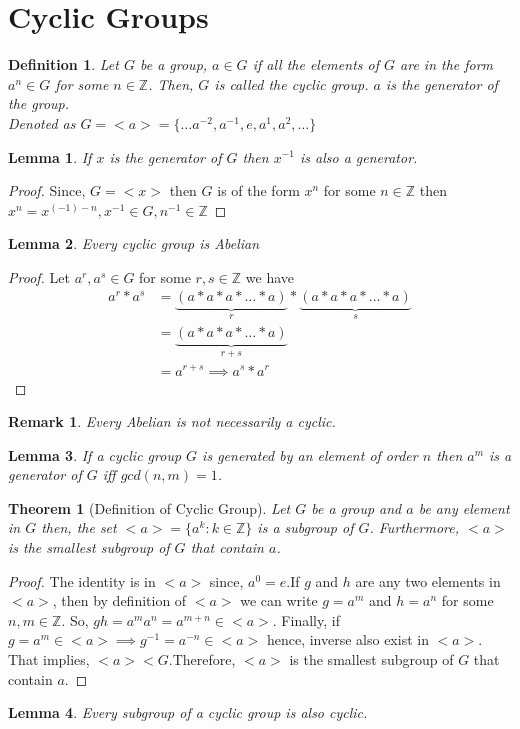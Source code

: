 \documentclass[12pt,a4paper]{article}
\newcommand{\Z}{\mathbb{Z}}
\newtheorem{thm}{Theorem}
\newtheorem{defn}{Definition}
\newtheorem{rem}{Remark}
\newtheorem{lem}{Lemma}
\begin{document}
  \section{Cyclic Groups}
  \begin{defn}
    Let $G$ be a group, $a\in G$ if all the elements of $G$ are in the form $a^n\in G$ for some $n\in \Z$. Then, $G$ is called the cyclic group. $a$ is the generator of the group. \\
    Denoted as $G=<a> = \{\dots a^{-2},a^{-1},e,a^{1},a^{2},\dots\}$
  \end{defn}
  \begin{lem}
    If $x$ is the generator of $G$ then $x^{-1}$ is also a generator.
  \end{lem}
  \begin{proof}
    Since, $G=<x>$ then $G$ is of the form $x^n$ for some $n\in \Z$ then $x^n=x^{(-1)-n}, x^{-1}\in G,n^{-1}\in \Z$ 
  \end{proof}
  \begin{lem}
    Every cyclic group is Abelian
  \end{lem}
  \begin{proof}
    Let $a^r,a^s\in G$ for some $r,s\in \Z$ we have 
    $$
    \begin{aligned}
      a^r*a^s &=\underbrace{(a*a*a*\dots *a)}_{r}*\underbrace{(a*a*a*\dots *a)}_{s}\\
          &= \underbrace{(a*a*a*\dots *a)}_{r+s} \\
          &=a^{r+s} \implies a^s*a^r
    \end{aligned}     
    $$
  \end{proof}
   \begin{rem}
    Every Abelian is not necessarily a cyclic.
   \end{rem}
  \begin{lem}
    If a cyclic group $G$ is generated by an element of order $n$ then $a^m$ is a generator of $G$ iff $gcd(n,m)=1$.
  \end{lem}
  \begin{thm}[Definition of Cyclic Group]
    Let $G$ be a group and $a$ be any element in $G$ then, the set $<a>=\{a^k:k\in \Z\}$ is a subgroup of $G$. Furthermore, $<a>$ is the smallest subgroup of $G$ that contain $a$.
  \end{thm}
  \begin{proof}
    The identity is in $<a>$ since, $a^0=e$.If $g$ and $h$ are any two elements in $<a>$, then by definition of $<a>$ we can write $g=a^m$ and $h=a^n$ for some $n,m\in \Z$. So, $gh=a^ma^n=a^{m+n} \in <a>$. Finally, if $g=a^m \in <a> \implies g^{-1}=a^{-n}\in <a>$ hence, inverse also exist in $<a>$. That implies, $<a> < G$.Therefore, $<a>$ is the smallest subgroup of $G$ that contain $a$. 
  \end{proof}
  \begin{lem}
    Every subgroup of a cyclic group is also cyclic.
  \end{lem}
\end{document}
